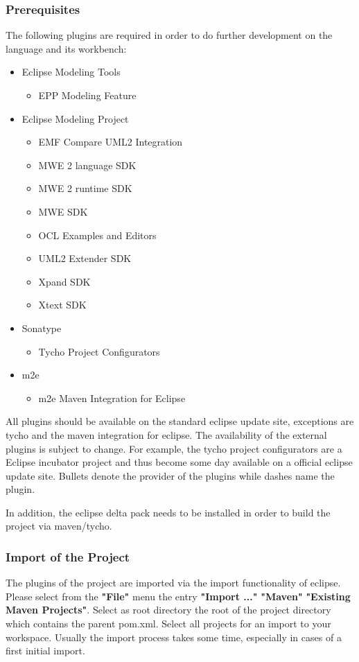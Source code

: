 \subsubsection{Prerequisites}
The following plugins are required in order to do further development on the 
language and its workbench: 
\begin{itemize}
  \item Eclipse Modeling Tools
  \begin{itemize}
    \item EPP Modeling Feature
  \end{itemize}
  \item Eclipse Modeling Project
  \begin{itemize}
    \item EMF Compare UML2 Integration
    \item MWE 2 language SDK
    \item MWE 2 runtime SDK
    \item MWE SDK
    \item OCL Examples and Editors
    \item UML2 Extender SDK
    \item Xpand SDK
    \item Xtext SDK
  \end{itemize}
  \item Sonatype
  \begin{itemize}
    \item Tycho Project Configurators
  \end{itemize}
  \item m2e
  \begin{itemize}
    \item m2e Maven Integration for Eclipse
  \end{itemize}
\end{itemize} 
All plugins should be available on the standard eclipse update site, exceptions
are tycho and the maven integration for eclipse. The availability of the 
external plugins is subject to change. For example, the tycho project 
configurators are a Eclipse incubator project and thus become some day available
on a official eclipse update site. Bullets denote the provider of the plugins
while dashes name the plugin.

In addition, the eclipse delta pack needs to be installed in order to build the 
project via maven/tycho.
 
\subsubsection{Import of the Project}
The plugins of the project are imported via the import functionality of eclipse.
Please select from the \textbf{"File"} menu the entry \textbf{"Import ..."} 
\textrightarrow \textbf{"Maven"} \textrightarrow  
\textbf{"Existing Maven Projects"}. Select as root
directory the root of the project directory which contains the parent pom.xml. 
Select all projects for an import to your workspace. Usually the import process
takes some time, especially in cases of a first initial import. 

